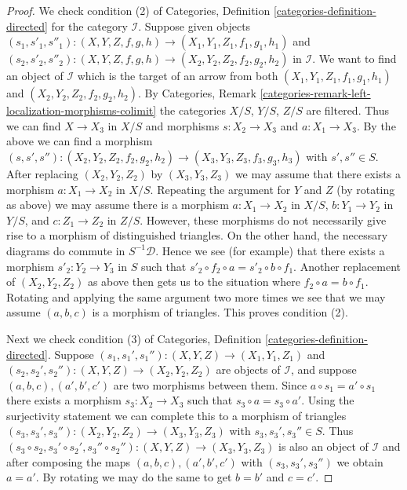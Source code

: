\begin{proof}
\medskip\noindent
We check condition (2) of
Categories, Definition \ref{categories-definition-directed}
for the category $\mathcal{I}$. Suppose given objects
$(s_1, s'_1, s''_1) : (X, Y, Z, f, g, h) \to (X_1, Y_1, Z_1, f_1, g_1, h_1)$
and
$(s_2, s'_2, s''_2) : (X, Y, Z, f, g, h) \to (X_2, Y_2, Z_2, f_2, g_2, h_2)$
in $\mathcal{I}$. We want to find an object of $\mathcal{I}$
which is the target of an arrow from both
$(X_1, Y_1, Z_1, f_1, g_1, h_1)$ and $(X_2, Y_2, Z_2, f_2, g_2, h_2)$.
By Categories, Remark
\ref{categories-remark-left-localization-morphisms-colimit}
the categories $X/S$, $Y/S$, $Z/S$ are filtered.
Thus we can find $X \to X_3$ in $X/S$ and morphisms
$s : X_2 \to X_3$ and $a : X_1 \to X_3$. By the above we can find a morphism
$(s, s', s'') : (X_2, Y_2, Z_2, f_2, g_2, h_2) \to
(X_3, Y_3, Z_3, f_3, g_3, h_3)$ with $s', s'' \in S$.
After replacing $(X_2, Y_2, Z_2)$ by $(X_3, Y_3, Z_3)$ we may
assume that there exists a morphism $a : X_1 \to X_2$ in $X/S$.
Repeating the argument for $Y$ and $Z$ (by rotating as above)
we may assume there is a morphism
$a : X_1 \to X_2$ in $X/S$,
$b : Y_1 \to Y_2$ in $Y/S$, and
$c : Z_1 \to Z_2$ in $Z/S$.
However, these morphisms do not necessarily give rise to a morphism of
distinguished triangles. On the other hand, the necessary diagrams
do commute in $S^{-1}\mathcal{D}$. Hence we see (for example) that
there exists a morphism $s'_2 : Y_2 \to Y_3$ in $S$ such that
$s'_2 \circ f_2 \circ a = s'_2 \circ b \circ f_1$. Another replacement
of $(X_2, Y_2, Z_2)$ as above then gets us to the situation where
$f_2 \circ a = b \circ f_1$. Rotating and applying the same argument
two more times we see that we may assume $(a, b, c)$ is a morphism
of triangles. This proves condition (2).

\medskip\noindent
Next we check condition (3) of
Categories, Definition \ref{categories-definition-directed}.
Suppose $(s_1, s_1', s_1'') : (X, Y, Z) \to (X_1, Y_1, Z_1)$ and
$(s_2, s_2', s_2'') : (X, Y, Z) \to (X_2, Y_2, Z_2)$
are objects of $\mathcal{I}$, and suppose $(a, b, c), (a', b', c')$
are two morphisms between them. Since $a \circ s_1 = a' \circ s_1$
there exists a morphism $s_3 : X_2 \to X_3$ such that
$s_3 \circ a = s_3 \circ a'$. Using the surjectivity statement
we can complete this to a morphism of triangles
$(s_3, s_3', s_3'') : (X_2, Y_2, Z_2) \to (X_3, Y_3, Z_3)$
with $s_3, s_3', s_3'' \in S$. Thus
$(s_3 \circ s_2, s_3' \circ s_2', s_3'' \circ s_2'') :
(X, Y, Z) \to (X_3, Y_3, Z_3)$ is also an object of $\mathcal{I}$
and after composing the maps $(a, b, c), (a', b', c')$ with
$(s_3, s_3', s_3'')$ we obtain $a = a'$. By rotating we may do the
same to get $b = b'$ and $c = c'$.


\end{proof}
